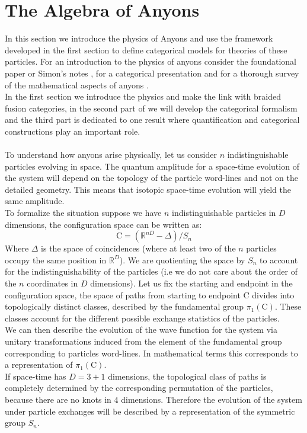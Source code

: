 \documentclass{article}
\begin{document}
\section{The Algebra of Anyons}
In this section we introduce the physics of Anyons and use the framework developed in the first section to define categorical models for theories of these particles. For an introduction to the physics of anyons consider the foundational paper \cite{Kitaev06} or Simon's notes \cite{Simon16}, for a categorical presentation \cite{Panangaden11} and for a thorough survey of the mathematical aspects of anyons \cite{Rowell17}.\\
In the first section we introduce the physics and make the link with braided fusion categories, in the second part of we will develop the categorical formalism and the third part is dedicated to one result where quantification and categorical constructions play an important role.\\~\\
To understand how anyons arise physically, let us consider $n$ indistinguishable particles evolving in space. The quantum amplitude for a space-time evolution of the system will depend on the topology of the particle word-lines and not on the detailed geometry. This means that isotopic space-time evolution will yield the same amplitude.\\
To formalize the situation suppose we have $n$ indistinguishable particles in $D$ dimensions, the configuration space can be written as:
$$ \mathrm{C}=(\mathbb{R}^{nD}-\Delta)/S_n$$
Where $\Delta$ is the space of coincidences (where at least two of the $n$ particles occupy the same position in $\mathbb{R}^D$). We are quotienting the space by $S_n$ to account for the indistinguishability of the particles (i.e we do not care about the order of the $n$ coordinates in $D$ dimensions). 
Let us fix the starting and endpoint in the configuration space, the space of paths from starting to endpoint $\mathrm{C}$ divides into topologically distinct classes, described by the fundamental group $\pi_1(\mathrm{C})$. These classes account for the different possible exchange statistics of the particles.\\
We can then describe the evolution of the wave function for the system via unitary transformations induced from the element of the fundamental group corresponding to particles word-lines. In mathematical terms this corresponds to a representation of $\pi_1(\mathrm{C})$. \\
If space-time has $D=3+1$ dimensions, the topological class of paths is completely determined by the corresponding permutation of the particles, because there are no knots in $4$ dimensions. Therefore the evolution of the system under particle exchanges will be described by a representation of the symmetric group $S_n$.
\end{document}
